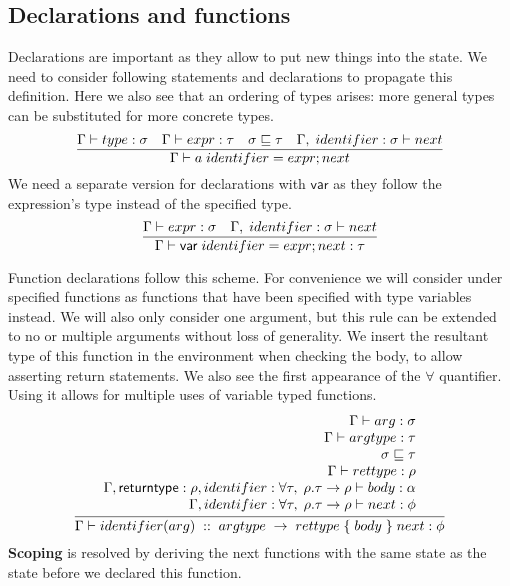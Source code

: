 \subsection{Declarations and functions}\label{sec:declarations}

Declarations are important as they allow to put new things into the state.
We need to consider following statements and declarations to propagate this definition.
Here we also see that an ordering of types arises: more general types can be substituted for more concrete types.
\[
    \infer{\Gamma \vdash a \; identifier = expr;next}{
        \Gamma \vdash type : \sigma &
        \Gamma \vdash expr : \tau &
        \sigma \sqsubseteq \tau &
        \Gamma,\; identifier : \sigma \vdash next
    }
\]
We need a separate version for declarations with $\mathsf{var}$ as they follow the expression's type instead of the specified type.
\[
    \infer{\Gamma \vdash \mathsf{var} \; identifier = expr;next : \tau}{
        \Gamma \vdash expr : \sigma &
        \Gamma,\; identifier : \sigma \vdash next
    }
\]

Function declarations follow this scheme. For convenience we will consider under specified functions as functions that have been specified with type variables instead. We will also only consider one argument, but this rule can be extended to no or multiple arguments without loss of generality. We insert the resultant type of this function in the environment when checking the body, to allow asserting return statements.
We also see the first appearance of the $\forall$ quantifier.
Using it allows for multiple uses of variable typed functions.
\[
    \infer{\Gamma \vdash identifier(arg)\; ::\; argtype\; \to\; rettype\; \{\; body\; \}\; next : \phi}{
        \begin{array}{r}
            \Gamma \vdash arg : \sigma \\
            \Gamma \vdash argtype : \tau\\
            \sigma \sqsubseteq \tau \\
            \Gamma \vdash rettype : \rho \\
            \Gamma, \mathsf{returntype} : \rho, identifier :\forall \tau,\;\rho. \tau \to \rho\vdash body : \alpha \\
            \Gamma, identifier :\forall \tau,\;\rho. \tau \to \rho \vdash next : \phi
        \end{array}
    }
\]
\textbf{Scoping} is resolved by deriving the next functions with the same state as the state before we declared this function.

